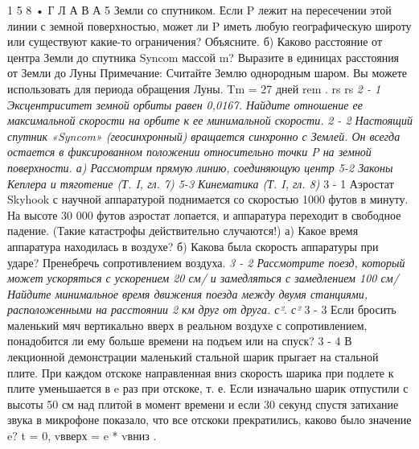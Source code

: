 \documentclass[11pt,oneside]{article}
\begin{document}
1 5 8 • Г Л А В А  5 Земли со спутником. Если P лежит на пересечении этой линии с земной поверхностью, может ли P иметь любую географическую широту или существуют какие-то ограничения? Объясните. б) Каково расстояние от центра Земли до спутника Syncom массой m? Выразите в единицах расстояния от Земли до Луны Примечание: Считайте Землю однородным шаром. Вы можете использовать для периода обращения Луны. Tm = 27 дней rem . rs rs \emph{ 2 - 1 Эксцентриситет земной орбиты равен 0,0167. Найдите отношение ее максимальной скорости на орбите к ее минимальной скорости. } \emph{ 2 - 2 Настоящий спутник «Syncom» (геосинхронный) вращается синхронно с Землей. Он всегда остается в фиксированном положении относительно точки P на земной поверхности. а) Рассмотрим прямую линию, соединяющую центр 5-2 Законы Кеплера и тяготение (Т. I, гл. 7) 5-3 Кинематика (Т. I, гл. 8) } 3 - 1 Аэростат Skyhook с научной аппаратурой поднимается со скоростью 1000 футов в минуту. На высоте 30 000 футов аэростат лопается, и аппаратура переходит в свободное падение. (Такие катастрофы действительно случаются!) а) Какое время аппаратура находилась в воздухе? б) Какова была скорость аппаратуры при ударе? Пренебречь сопротивлением воздуха. \emph{ 3 - 2 Рассмотрите поезд, который может ускоряться с ускорением 20 см/ и замедляться с замедлением 100 см/ Найдите минимальное время движения поезда между двумя станциями, расположенными на расстоянии 2 км друг от друга. с². с² } 3 - 3 Если бросить маленький мяч вертикально вверх в реальном воздухе с сопротивлением, понадобится ли ему больше времени на подъем или на спуск? \emph{ } 3 - 4 В лекционной демонстрации маленький стальной шарик прыгает на стальной плите. При каждом отскоке направленная вниз скорость шарика при подлете к плите уменьшается в e раз при отскоке, т. е. Если изначально шарик отпустили с высоты 50 см над плитой в момент времени и если 30 секунд спустя затихание звука в микрофоне показало, что все отскоки прекратились, каково было значение e? t = 0, vвверх = e * vвниз .\par
\end{document}
